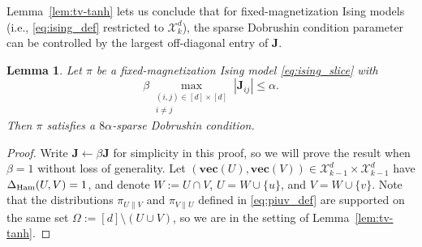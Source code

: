 \documentclass[11pt]{article}
\newtheorem{lemma}{Lemma}
\newcommand{\defeq}{:=}
\newcommand{\1}{\mathbf{1}}
\newcommand{\0}{\mathbf{0}}
\newcommand{\dham}{\Delta_{\textup{Ham}}}
\newcommand{\Abs}[1]{\left|#1\right|}
\newcommand{\mj}{{\mathbf{J}}}
\newcommand{\calX}{{\mathcal{X}}}
\newcommand{\vvec}{\mathbf{vec}}
\begin{document}
Lemma~\ref{lem:tv-tanh} lets us conclude that for fixed-magnetization Ising models (i.e., \eqref{eq:ising_def} restricted to $\calX^d_k$), the sparse Dobrushin condition parameter can be controlled by the largest off-diagonal entry of $\mj$.

\begin{lemma}
    \label{lem:sparse_dobrushin_ising_slice}
Let $\pi$ be a fixed-magnetization Ising model \eqref{eq:ising_slice} with 
\[\beta \max_{\substack{(i, j) \in [d] \times [d] \\ i \neq j}} \Abs{\mj_{ij}} \le \alpha.\]
Then $\pi$ satisfies a $8\alpha$-sparse Dobrushin condition.
\end{lemma}
\begin{proof}
Write $\mj \gets \beta\mj$ for simplicity in this proof, so we will prove the result when $\beta = 1$ without loss of generality.
Let $(\vvec(U), \vvec(V)) \in \calX^d_{k - 1} \times \calX^d_{k - 1}$ have $\dham(U, V) = 1$, and denote $W \defeq U \cap V$, $U = W \cup \{u\}$, and $V = W \cup \{v\}$. Note that the distributions $\pi_{U \| V}$ and $\pi_{V \| U}$ defined in \eqref{eq:piuv_def} are supported on the same set $\Omega \defeq [d] \setminus (U \cup V)$, so we are in the setting of Lemma~\ref{lem:tv-tanh}.


\end{proof}
\end{document}

